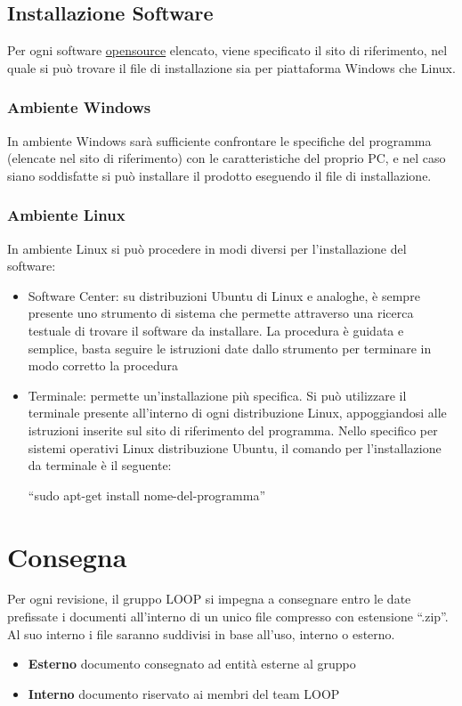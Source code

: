 \documentclass[a4paper,11pt]{article}
\begin{document}
\subsection{Installazione Software}
Per ogni software \underline{opensource} elencato, viene specificato il sito di riferimento, nel quale si pu\`o trovare il file di installazione sia per piattaforma Windows che Linux. 

\subsubsection{Ambiente Windows}
In ambiente Windows sar\`a sufficiente confrontare le specifiche del programma (elencate nel sito di riferimento) con le caratteristiche del proprio PC, e nel caso siano soddisfatte si pu\`o installare il prodotto eseguendo il file di installazione.

\subsubsection{Ambiente Linux}
In ambiente Linux si pu\`o procedere in modi diversi per l'installazione del software:
\begin{itemize}
\item Software Center: su distribuzioni Ubuntu di Linux e analoghe, \`e sempre presente uno strumento di sistema che permette attraverso una ricerca testuale di trovare il software da installare. La procedura \`e guidata e semplice, basta seguire le istruzioni date dallo strumento per terminare in modo corretto la procedura 
\item Terminale: permette un'installazione pi\`u specifica. Si pu\`o utilizzare il terminale presente all'interno di ogni distribuzione Linux, appoggiandosi alle istruzioni inserite sul sito di riferimento del programma.
Nello specifico per sistemi operativi Linux distribuzione Ubuntu, il comando per l'installazione da terminale \`e il seguente:

\begin{center}
``sudo apt-get install nome-del-programma''
\end{center}

\end{itemize}
\newpage

\section{Consegna}
Per ogni revisione, il gruppo LOOP si impegna a consegnare entro le date prefissate i documenti all'interno di un unico file compresso con estensione ``.zip''. Al suo interno i file saranno suddivisi in base all'uso, interno o esterno.
\begin{itemize}
\item \textbf{Esterno} documento consegnato ad entit\`a esterne al gruppo
\item \textbf{Interno} documento riservato ai membri del team LOOP
\end{itemize} 
\newpage
\end{document}
